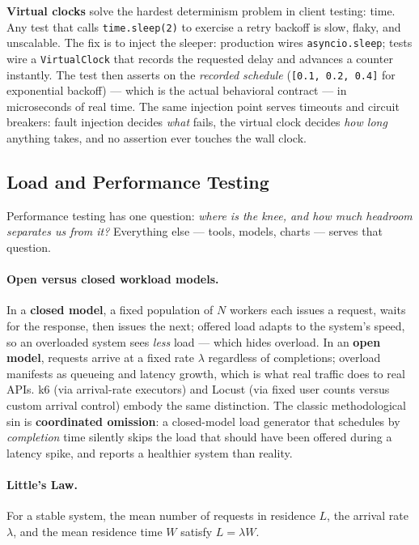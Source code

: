 \textbf{Virtual clocks} solve the hardest determinism problem in client
testing: time. Any test that calls \texttt{time.sleep(2)} to exercise a
retry backoff is slow, flaky, and unscalable. The fix is to inject the
sleeper: production wires \texttt{asyncio.sleep}; tests wire a
\texttt{VirtualClock} that records the requested delay and advances a
counter instantly. The test then asserts on the \emph{recorded schedule}
(\texttt{[0.1, 0.2, 0.4]} for exponential backoff) --- which is the actual
behavioral contract --- in microseconds of real time. The same injection
point serves timeouts and circuit breakers: fault injection decides
\emph{what} fails, the virtual clock decides \emph{how long} anything
takes, and no assertion ever touches the wall clock.

\subsection{Load and Performance Testing}
\label{sec:ch19-load}

Performance testing has one question: \emph{where is the knee, and how much
headroom separates us from it?} Everything else --- tools, models, charts
--- serves that question.

\paragraph{Open versus closed workload models.}
In a \textbf{closed model}, a fixed population of $N$ workers each issues a
request, waits for the response, then issues the next; offered load adapts
to the system's speed, so an overloaded system sees \emph{less} load ---
which hides overload. In an \textbf{open model}, requests arrive at a fixed
rate $\lambda$ regardless of completions; overload manifests as queueing
and latency growth, which is what real traffic does to real APIs. k6
(via arrival-rate executors) and Locust (via fixed user counts versus
custom arrival control) embody the same distinction. The classic
methodological sin is \textbf{coordinated omission}: a closed-model
load generator that schedules by \emph{completion} time silently skips the
load that should have been offered during a latency spike, and reports a
healthier system than reality.

\paragraph{Little's Law.}
\begin{theorem}
\label{thm:little}
For a stable system, the mean number of requests in residence $L$, the
arrival rate $\lambda$, and the mean residence time $W$ satisfy
$L = \lambda W$.
\end{theorem}

